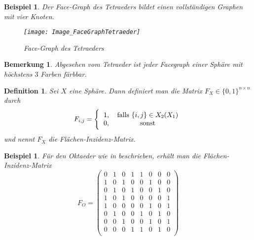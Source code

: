 \documentclass[12pt,titlepage,twoside,cleardoublepage]{article}
\theoremstyle{nummermitklammern}
\newtheorem{bsp}[temp]{Beispiel}
\newtheorem{definition}[temp]{Definition}
\newtheorem{bemerkung}[temp]{Bemerkung}
\newtheorem{definition}[zahl]{Definition}
\newtheorem{bsp}[zahl]{Beispiel}
\newtheorem{bemerkung}[zahl]{Bemerkung}
\numberwithin{equation}{section}
\begin{document}
\begin{bsp}
Der Face-Graph des Tetraeders bildet einen vollständigen Graphen mit vier Knoten.
\begin{figure}[H]
\begin{center}
\texttt{[image: Image\_FaceGraphTetraeder]}
\end{center}
\caption{Face-Graph des Tetraeders}
\end{figure}
\end{bsp}
\begin{bemerkung}
Abgesehen vom Tetraeder ist jeder Facegraph einer Sphäre mit höchstens $3$ Farben färbbar.
\end{bemerkung}
\begin{definition}
Sei $X$ eine Sphäre. Dann definiert man die Matrix 
$F_X\in \{0,1\}^{n \times n}$ durch
\[
F_{i,j}=
\Biggl\{
\begin{tabular}[l]{lcr}
1,&\textcolor{black}{falls $\{i,j\}\in X_2(X_1)$} \\
0,& sonst\\
\end{tabular}
\] und nennt $F_X$ die Flächen-Inzidenz-Matrix. 
\end{definition}
\begin{bsp}
Für den Oktaeder wie in  beschrieben, erhält man die Flächen-Inzidenz-Matrix 
\[
F_O=
\left( \begin{array}{rrrrrrrr}
0 & 1 & 0 & 1 & 1 & 0 & 0 & 0\\ 
1 & 0 & 1 & 0 & 0 & 1 & 0 & 0\\
0 & 1 & 0 & 1 & 0 & 0 & 1 & 0\\
1 & 0 & 1 & 0 & 0 & 0 & 0 & 1\\ 
1 & 0 & 0 & 0 & 0 & 1 & 0 & 1\\
0 & 1 & 0 & 0 & 1 & 0 & 1 & 0\\
0 & 0 & 1 & 0 & 0 & 1 & 0 & 1\\
0 & 0 & 0 & 1 & 1 & 0 & 1 & 0\\
\end{array}
\right)
\]

\end{bsp}
\end{document}
